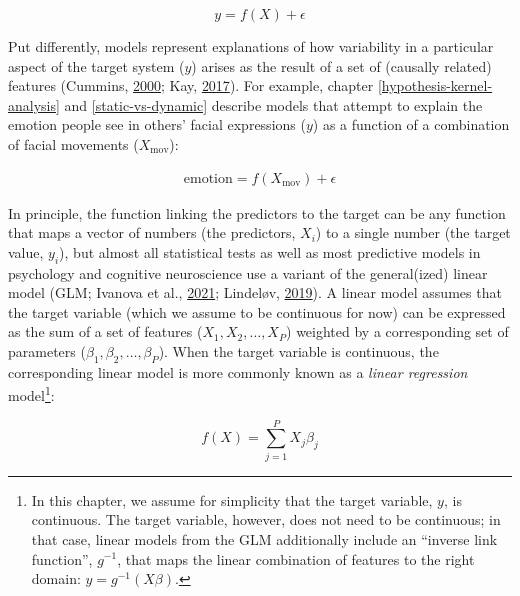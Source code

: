 \documentclass[11pt,american,a4paper,oneside,]{memoir} %
\let\rmarkdownfootnote\footnote%
\def\footnote{\protect\rmarkdownfootnote}
\begin{document}
\begin{equation}
y = f(X) + \epsilon
\end{equation}

Put differently, models represent explanations of how variability in a particular aspect of the target system (\(y\)) arises as the result of a set of (causally related) features (Cummins, \protect\hyperlink{ref-Cummins2000-pk}{2000}; Kay, \protect\hyperlink{ref-Kay2017-vr}{2017}). For example, chapter \ref{hypothesis-kernel-analysis} and \ref{static-vs-dynamic} describe models that attempt to explain the emotion people see in others' facial expressions (\(y\)) as a function of a combination of facial movements (\(X_{\mathrm{mov}}\)):

\begin{align}
\mathrm{emotion} = f(X_{\mathrm{mov}}) + \epsilon
\end{align}

In principle, the function linking the predictors to the target can be any function that maps a vector of numbers (the predictors, \(X_{i}\)) to a single number (the target value, \(y_{i}\)), but almost all statistical tests as well as most predictive models in psychology and cognitive neuroscience use a variant of the general(ized) linear model (GLM; Ivanova et al., \protect\hyperlink{ref-Ivanova2021-wk}{2021}; Lindeløv, \protect\hyperlink{ref-Lindelov2019-jk}{2019}). A linear model assumes that the target variable (which we assume to be continuous for now) can be expressed as the sum of a set of features (\(X_{1}, X_{2}, \dots , X_{P}\)) weighted by a corresponding set of parameters (\(\beta_{1}, \beta_{2}, \dots , \beta_{P}\)). When the target variable is continuous, the corresponding linear model is more commonly known as a \emph{linear regression} model\footnote{In this chapter, we assume for simplicity that the target variable, \(y\), is continuous. The target variable, however, does not need to be continuous; in that case, linear models from the GLM additionally include an ``inverse link function'', \(g^{-1}\), that maps the linear combination of features to the right domain: \(y = g^{-1}(X\beta)\).}:

\begin{equation}
f(X) = \sum_{j=1}^{P}X_{j} \beta_{j}
\end{equation}
\end{document}

